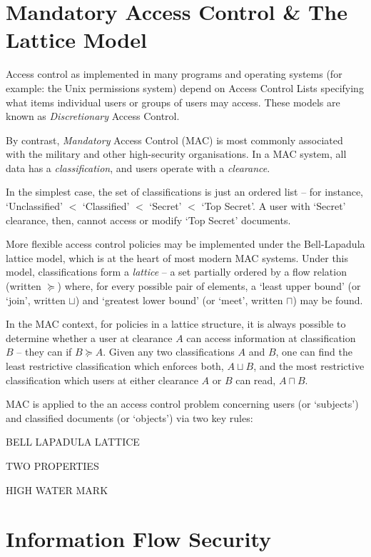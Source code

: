 \section{Mandatory Access Control \& The Lattice Model}

Access control as implemented in many programs and operating systems (for example: the Unix permissions system) depend on Access Control Lists specifying what items individual users or groups of users may access. These models are known as \textit{Discretionary} Access Control.

By contrast, \textit{Mandatory} Access Control (MAC) is most commonly associated with the military and other high-security organisations. In a MAC system, all data has a \textit{classification}, and users operate with a \textit{clearance}. 

In the simplest case, the set of classifications is just an ordered list -- for instance, `Unclassified' $ < $ `Classified' $ < $ `Secret' $ < $ `Top Secret'. A user with `Secret' clearance, then, cannot access or modify `Top Secret' documents.

More flexible access control policies may be implemented under the Bell-Lapadula lattice model, which is at the heart of most modern MAC systems. Under this model, classifications form a \textit{lattice} -- a set partially ordered by a flow relation (written $ \succeq $) where, for every possible pair of elements, a `least upper bound' (or `join', written $ \sqcup $) and `greatest lower bound' (or `meet', written $ \sqcap $) may be found.

In the MAC context, for policies in a lattice structure, it is always possible to determine whether a user at clearance $ A $ can access information at classification $ B $ -- they can if $ B \succeq A $. Given any two classifications $ A $ and $ B $, one can find the least restrictive classification which enforces both, $ A \sqcup B $, and the most restrictive classification which users at either clearance $ A $ or $ B $ can read, $ A \sqcap B $.

MAC is applied to the an access control problem concerning users (or `subjects') and classified documents (or `objects') via two key rules:



BELL LAPADULA LATTICE

TWO PROPERTIES

HIGH WATER MARK

\section{Information Flow Security}

